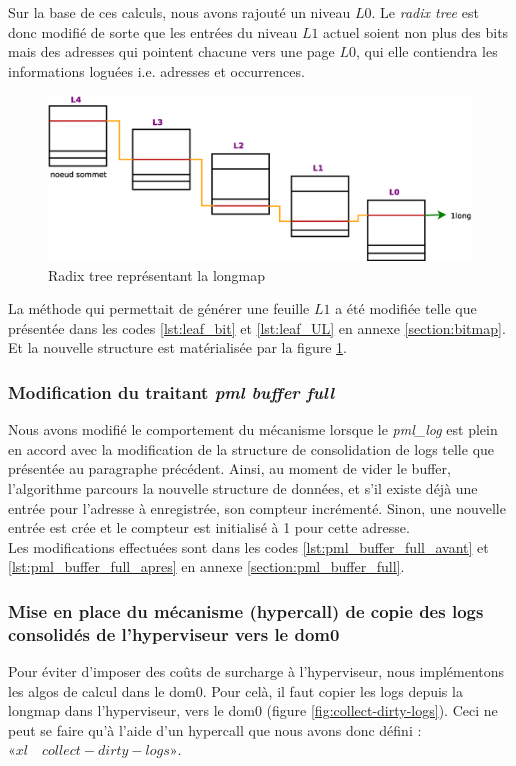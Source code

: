 \noindent Sur la base de ces calculs, nous avons rajouté un niveau $L0$. Le \textit{radix tree} est donc modifié de sorte que les entrées du niveau $L1$ actuel soient non plus des bits mais des adresses qui pointent chacune vers une page $L0$, qui elle contiendra les informations loguées i.e. adresses et occurrences.\\

\begin{figure}[H]
    \centering
    \includegraphics[scale=.6,width=1\linewidth]{chapters/4/fig4/longmap}
    \caption{Radix tree représentant la longmap}
    \label{fig:longmap}
\end{figure}

\noindent La méthode qui permettait de générer une feuille $L1$ a été modifiée telle que présentée dans les codes \ref{lst:leaf_bit} et \ref{lst:leaf_UL} en annexe \ref{section:bitmap}. Et la nouvelle structure est matérialisée par la figure \ref{fig:longmap}.

\subsubsection{Modification du traitant \textit{pml buffer full}}
Nous avons modifié le comportement du mécanisme lorsque le \textit{pml\_log} est plein en accord avec la modification de la structure de consolidation de logs telle que présentée au paragraphe précédent. Ainsi, au moment de vider le buffer, l'algorithme parcours la nouvelle structure de données, et s'il existe déjà une entrée pour l'adresse à enregistrée, son compteur incrémenté. Sinon, une nouvelle entrée est crée et le compteur est initialisé à 1 pour cette adresse.\\
Les modifications effectuées sont dans les codes \ref{lst:pml_buffer_full_avant} et \ref{lst:pml_buffer_full_apres} en annexe \ref{section:pml_buffer_full}.

\subsubsection{Mise en place du mécanisme (hypercall) de copie des logs consolidés de l'hyperviseur vers le dom0}
Pour éviter d'imposer des coûts de surcharge à l'hyperviseur, nous implémentons les algos de calcul dans le dom0. Pour celà, il faut copier les logs depuis la longmap dans l'hyperviseur, vers le dom0 (figure \ref{fig:collect-dirty-logs}). Ceci ne peut se faire qu'à l'aide d'un hypercall que nous avons donc défini : $«xl \quad collect-dirty-logs»$.\\

